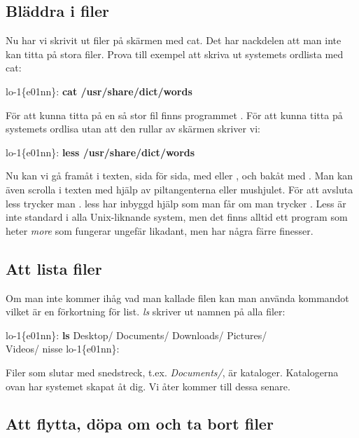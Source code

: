 \documentclass[a4paper,twocolumn]{book}
\begin{document}
\subsection{Bläddra i filer}

Nu har vi skrivit ut filer på skärmen med cat. Det har nackdelen att man
inte kan titta på stora filer. Prova till exempel att skriva ut systemets
ordlista med cat:

\begin{example}
  lo-1\{e01nn\}: \textbf{cat /usr/share/dict/words}
\end{example}

För att kunna titta på en så stor fil finns programmet . För att
kunna titta på systemets ordlisa utan att den rullar av skärmen skriver vi:

\begin{example}
  lo-1\{e01nn\}: \textbf{less /usr/share/dict/words}
\end{example}

Nu kan vi gå framåt i texten, sida för sida, med  eller
, och bakåt med . Man kan även scrolla i texten med hjälp av piltangenterna eller mushjulet. För att avsluta less trycker man .
less har inbyggd hjälp som man får om man trycker .
Less är inte standard i alla Unix-liknande system, men det finns alltid ett
program som heter \emph{more} som fungerar ungefär likadant, men har några färre finesser.

\subsection{Att lista filer}

Om man inte kommer ihåg vad man kallade filen kan man använda
kommandot  vilket är en förkortning för list. \emph{ls}
skriver ut namnen på alla filer:
\begin{example}
  lo-1\{e01nn\}: \textbf{ls}
  Desktop/ Documents/ Downloads/ Pictures/\\Videos/   nisse
  lo-1\{e01nn\}:
\end{example}
Filer som slutar med snedstreck, t.ex. \emph{Documents/}, är kataloger.
Katalogerna ovan har systemet skapat åt dig. Vi åter kommer till dessa senare.

\subsection{Att flytta, döpa om och ta bort filer}
\end{document}
